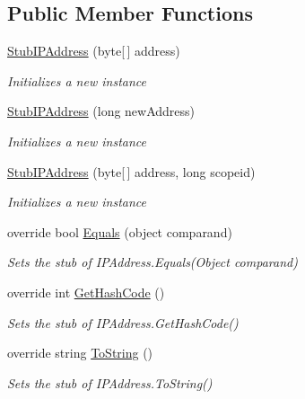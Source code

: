 \subsection*{Public Member Functions}
\begin{DoxyCompactItemize}
\item 
\hyperlink{class_system_1_1_net_1_1_fakes_1_1_stub_i_p_address_a8f4be0aa1a9088dc24ad64262d53e1eb}{Stub\-I\-P\-Address} (byte\mbox{[}$\,$\mbox{]} address)
\begin{DoxyCompactList}\small\item\em Initializes a new instance\end{DoxyCompactList}\item 
\hyperlink{class_system_1_1_net_1_1_fakes_1_1_stub_i_p_address_a78c1e9527aeb0ce7ddf8bae700b6fbab}{Stub\-I\-P\-Address} (long new\-Address)
\begin{DoxyCompactList}\small\item\em Initializes a new instance\end{DoxyCompactList}\item 
\hyperlink{class_system_1_1_net_1_1_fakes_1_1_stub_i_p_address_a3edea5db9059c7a6f73b8adc261e0bbd}{Stub\-I\-P\-Address} (byte\mbox{[}$\,$\mbox{]} address, long scopeid)
\begin{DoxyCompactList}\small\item\em Initializes a new instance\end{DoxyCompactList}\item 
override bool \hyperlink{class_system_1_1_net_1_1_fakes_1_1_stub_i_p_address_aacb9e7f92594d04124dacf1208c1c0b8}{Equals} (object comparand)
\begin{DoxyCompactList}\small\item\em Sets the stub of I\-P\-Address.\-Equals(\-Object comparand)\end{DoxyCompactList}\item 
override int \hyperlink{class_system_1_1_net_1_1_fakes_1_1_stub_i_p_address_a31ab953c9ef52fc36eda2d6b285c786b}{Get\-Hash\-Code} ()
\begin{DoxyCompactList}\small\item\em Sets the stub of I\-P\-Address.\-Get\-Hash\-Code()\end{DoxyCompactList}\item 
override string \hyperlink{class_system_1_1_net_1_1_fakes_1_1_stub_i_p_address_a79b2a590d309126a6141168ef78f294e}{To\-String} ()
\begin{DoxyCompactList}\small\item\em Sets the stub of I\-P\-Address.\-To\-String()\end{DoxyCompactList}\end{DoxyCompactItemize}
